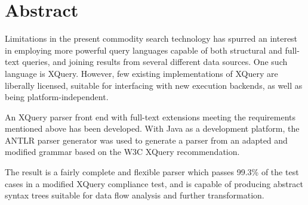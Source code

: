 \chapter*{Abstract}
Limitations in the present commodity search technology has spurred
an interest in employing more powerful query languages capable of both
structural and full-text queries, and joining results from several different data
sources. One such language is XQuery. However, few existing implementations of
XQuery are liberally licensed, suitable for interfacing with new execution
backends, as well as being platform-independent. 

An XQuery parser front end with full-text extensions meeting the requirements
mentioned above has been developed. With Java as a development platform, the
ANTLR parser generator was used to generate a parser from an adapted and
modified grammar based on the W3C XQuery recommendation. 

The result is a fairly complete and flexible parser which passes
99.3\% of the test cases in a modified XQuery compliance test, and is capable of
producing abstract syntax trees suitable for data flow analysis and further 
transformation.